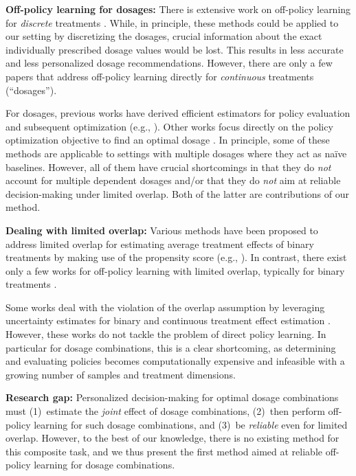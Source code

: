 \documentclass{article}
\theoremstyle{definition}
\theoremstyle{plain}
\begin{document}
\textbf{Off-policy learning for dosages:} There is extensive work on off-policy learning for \emph{discrete} treatments \cite{Athey.2021, Bennett.2020, Bennett.2019b, Dudik.2014, Foster.2019, Hatt.2022b, Kallus.2018, Kallus.2022b, ma2022learning, ma2023learning, tang2022leveraging, Thomas.2016, Zhou.2023}. While, in principle, these methods could be applied to our setting by discretizing the dosages, crucial information about the exact individually prescribed dosage values would be lost. This results in less accurate and less personalized dosage recommendations. However, there are only a few papers that address off-policy learning directly for \emph{continuous} treatments (``dosages''). 

For dosages, previous works have derived efficient estimators for policy evaluation and subsequent optimization (e.g., \cite{Demirer.2019, Kallus.2018e}). Other works focus directly on the policy optimization objective to find an optimal dosage \cite{Chen.2016, AkshayKrishnamurthy.2020, Zou.2022}. In principle, some of these methods are applicable to settings with multiple dosages where they act as na{\"i}ve baselines. However, all of them have crucial shortcomings in that they do \emph{not} account for multiple dependent dosages and/or that they do \emph{not} aim at reliable decision-making under limited overlap. Both of the latter are contributions of our method.   

\textbf{Dealing with limited overlap:} 
Various methods have been proposed to address limited overlap for estimating average treatment effects of binary treatments by making use of the propensity score (e.g., \cite{Cochran.1974, DAmour.2021, Heckman.1997, Ionides.2008, Kallus.2020, Rubin.2010}). In contrast, there exist only a few works for off-policy learning with limited overlap, typically for binary treatments \cite{Kallus.2021, Kallus.2018f, Swaminathan.2015}.

Some works deal with the violation of the overlap assumption by leveraging uncertainty estimates for binary \cite{Jesson.2020} and continuous treatment effect estimation \cite{Jesson.2022}. However, these works do not tackle the problem of direct policy learning. In particular for dosage combinations, this is a clear shortcoming, as determining and evaluating policies becomes computationally expensive and infeasible with a growing number of samples and treatment dimensions.

\textbf{Research gap:} Personalized decision-making for optimal dosage combinations must (1)~estimate the \emph{joint} effect of dosage combinations, (2)~then perform off-policy learning for such dosage combinations, and (3)~be \emph{reliable} even for limited overlap. However, to the best of our knowledge, there is no existing method for this composite task, and we thus present the first method aimed at reliable off-policy learning for dosage combinations.
\end{document}

